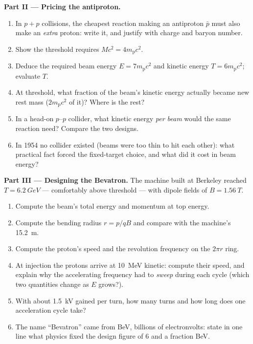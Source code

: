\begin{problem}
\medskip\noindent\textbf{Part II --- Pricing the antiproton.}
\begin{enumerate}[resume]
  \item In $p + p$ collisions, the cheapest reaction making an
        antiproton $\bar p$ must also make an \emph{extra} proton:
        write it, and justify with charge and baryon number.
  \item Show the threshold requires $Mc^2 = 4m_{\text{p}}c^2$.
  \item Deduce the required beam energy $E = 7m_{\text{p}}c^2$ and
        kinetic energy $T = 6m_{\text{p}}c^2$; evaluate $T$.
  \item At threshold, what fraction of the beam's kinetic energy
        actually became new rest mass ($2m_{\text{p}}c^2$ of it)?
        Where is the rest?
  \item In a head-on $p$--$p$ collider, what kinetic energy
        \emph{per beam} would the same reaction need? Compare the
        two designs.
  \item In 1954 no collider existed (beams were too thin to hit each
        other): what practical fact forced the fixed-target choice,
        and what did it cost in beam energy?
\end{enumerate}

\medskip\noindent\textbf{Part III --- Designing the Bevatron.}
The machine built at Berkeley reached $T = \qty{6.2}{GeV}$ ---
comfortably above threshold --- with dipole fields of $B =
\qty{1.56}{T}$.
\begin{enumerate}[resume]
  \item Compute the beam's total energy and momentum at top energy.
  \item Compute the bending radius $r = p/qB$ and compare with the
        machine's \qty{15.2}{m}.
  \item Compute the proton's speed and the revolution frequency on
        the $2\pi r$ ring.
  \item At injection the protons arrive at \qty{10}{MeV} kinetic:
        compute their speed, and explain why the accelerating
        frequency had to \emph{sweep} during each cycle (which two
        quantities change as $E$ grows?).
  \item With about \qty{1.5}{kV} gained per turn, how many turns and
        how long does one acceleration cycle take?
  \item The name ``Bevatron'' came from BeV, billions of
        electronvolts: state in one line what physics fixed the
        design figure of $6$ and a fraction BeV.
\end{enumerate}


\end{problem}
